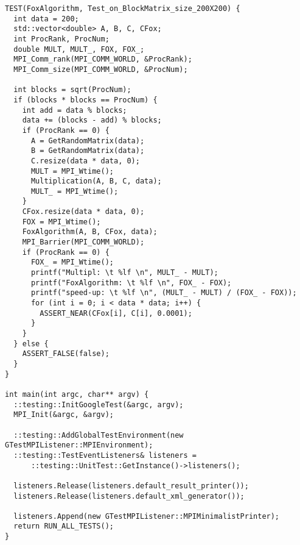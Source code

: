 \documentclass{report}
\begin{document}
\begin{lstlisting}
TEST(FoxAlgorithm, Test_on_BlockMatrix_size_200X200) {
  int data = 200;
  std::vector<double> A, B, C, CFox;
  int ProcRank, ProcNum;
  double MULT, MULT_, FOX, FOX_;
  MPI_Comm_rank(MPI_COMM_WORLD, &ProcRank);
  MPI_Comm_size(MPI_COMM_WORLD, &ProcNum);

  int blocks = sqrt(ProcNum);
  if (blocks * blocks == ProcNum) {
    int add = data % blocks;
    data += (blocks - add) % blocks;
    if (ProcRank == 0) {
      A = GetRandomMatrix(data);
      B = GetRandomMatrix(data);
      C.resize(data * data, 0);
      MULT = MPI_Wtime();
      Multiplication(A, B, C, data);
      MULT_ = MPI_Wtime();
    }
    CFox.resize(data * data, 0);
    FOX = MPI_Wtime();
    FoxAlgorithm(A, B, CFox, data);
    MPI_Barrier(MPI_COMM_WORLD);
    if (ProcRank == 0) {
      FOX_ = MPI_Wtime();
      printf("Multipl: \t %lf \n", MULT_ - MULT);
      printf("FoxAlgorithm: \t %lf \n", FOX_ - FOX);
      printf("speed-up: \t %lf \n", (MULT_ - MULT) / (FOX_ - FOX));
      for (int i = 0; i < data * data; i++) {
        ASSERT_NEAR(CFox[i], C[i], 0.0001);
      }
    }
  } else {
    ASSERT_FALSE(false);
  }
}

int main(int argc, char** argv) {
  ::testing::InitGoogleTest(&argc, argv);
  MPI_Init(&argc, &argv);

  ::testing::AddGlobalTestEnvironment(new GTestMPIListener::MPIEnvironment);
  ::testing::TestEventListeners& listeners =
      ::testing::UnitTest::GetInstance()->listeners();

  listeners.Release(listeners.default_result_printer());
  listeners.Release(listeners.default_xml_generator());

  listeners.Append(new GTestMPIListener::MPIMinimalistPrinter);
  return RUN_ALL_TESTS();
}
\end{lstlisting}
\end{document}
